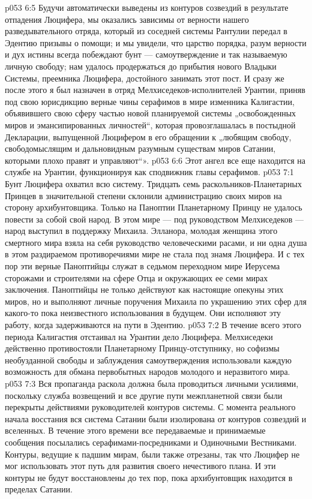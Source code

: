 \vs p053 6:5 Будучи автоматически выведены из контуров созвездий в результате отпадения Люцифера, мы оказались зависимы от верности нашего разведывательного отряда, который из соседней системы Рантулии передал в Эдентию призывы о помощи; и мы увидели, что царство порядка, разум верности и дух истины всегда побеждают бунт --- самоутверждение и так называемую личную свободу; нам удалось продержаться до прибытия нового Владыки Системы, преемника Люцифера, достойного занимать этот пост. И сразу же после этого я был назначен в отряд Мелхиседеков\hyp{}исполнителей Урантии, приняв под свою юрисдикцию верные чины серафимов в мире изменника Калигастии, объявившего свою сферу частью новой планируемой системы „освобожденных миров и эмансипированных личностей“, которая провозглашалась в постыдной Декларации, выпущенной Люцифером в его обращении к „любящим свободу, свободомыслящим и дальновидным разумным существам миров Сатании, которыми плохо правят и управляют“».
\vs p053 6:6 \pc Этот ангел все еще находится на службе на Урантии, функционируя как сподвижник главы серафимов.
\vs p053 7:1 Бунт Люцифера охватил всю систему. Тридцать семь раскольников\hyp{}Планетарных Принцев в значительной степени склонили администрацию своих миров на сторону архибунтовщика. Только на Паноптии Планетарному Принцу не удалось повести за собой свой народ. В этом мире --- под руководством Мелхиседеков --- народ выступил в поддержку Михаила. Элланора, молодая женщина этого смертного мира взяла на себя руководство человеческими расами, и ни одна душа в этом раздираемом противоречиями мире не стала под знамя Люцифера. И с тех пор эти верные Паноптийцы служат в седьмом переходном мире Иерусема сторожами и строителями на сфере Отца и окружающих ее семи мирах заключения. Паноптийцы не только действуют как настоящие опекуны этих миров, но и выполняют личные поручения Михаила по украшению этих сфер для какого\hyp{}то пока неизвестного использования в будущем. Они исполняют эту работу, когда задерживаются на пути в Эдентию.
\vs p053 7:2 В течение всего этого периода Калигастия отстаивал на Урантии дело Люцифера. Мелхиседеки действенно противостояли Планетарному Принцу\hyp{}отступнику, но софизмы необузданной свободы и заблуждения самоутверждения использовали каждую возможность для обмана первобытных народов молодого и неразвитого мира.
\vs p053 7:3 Вся пропаганда раскола должна была проводиться личными усилиями, поскольку служба возвещений и все другие пути межпланетной связи были перекрыты действиями руководителей контуров системы. С момента реального начала восстания вся система Сатании были изолирована от контуров созвездий и вселенных. В течение этого времени все передаваемые и принимаемые сообщения посылались серафимами\hyp{}посредниками и Одиночными Вестниками. Контуры, ведущие к падшим мирам, были также отрезаны, так что Люцифер не мог использовать этот путь для развития своего нечестивого плана. И эти контуры не будут восстановлены до тех пор, пока архибунтовщик находится в пределах Сатании.
